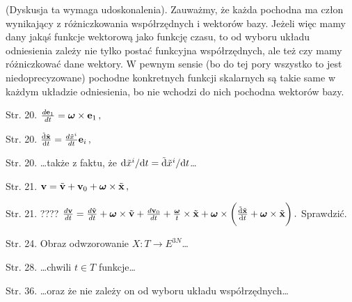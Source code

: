 \documentclass[a4paper,11pt]{article}
\numberwithin{equation}{section}
\begin{document}
(Dyskusja ta wymaga udoskonalenia). Zauważmy, że każda pochodna ma
człon wynikający z różniczkowania współrzędnych i wektorów bazy.
Jeżeli więc mamy dany jakąś funkcje wektorową jako funkcję czasu, to
od wyboru układu odniesienia zależy nie tylko postać funkcyjna
współrzędnych, ale też czy mamy różniczkować dane wektory. W pewnym
sensie (bo do tej pory wszystko to jest niedoprecyzowane) pochodne
konkretnych funkcji skalarnych są takie same w każdym układzie
odniesienia, bo nie wchodzi do nich pochodna wektorów bazy.



Str. 20.
$\frac{ d\mathbf{e}_{ 1 } }{ dt } = \boldsymbol{\omega} \times \mathbf{e}_{ 1 } \, ,$

Str. 20.
$\frac{ \tilde{ \mathrm{d} } \tilde{ \mathbf{x} } }{ \mathrm{d} t }
= \frac{ d\tilde{ x }^{ i } }{ dt } \mathbf{e}_{ i } \, ,$

Str. 20. \ldots także z faktu, że
$\mathrm{d} \tilde{ x }^{ i } / \mathrm{d} t = \tilde{ \mathrm{d} } \tilde{ x
}^{ i } / \mathrm{d} t$\ldots

Str. 21.
$\mathbf{v} = \tilde{ \mathbf{v} } + \mathbf{v}_{ 0 } +
\boldsymbol{\omega} \times \tilde{ \mathbf{x} } \, ,$

Str. 21. ????
$\frac{ d\mathbf{v} }{ dt } = \frac{ d\tilde{ \mathbf{v} } }{ dt }
+ \boldsymbol{\omega} \times \tilde{ \mathbf{v} } + \frac{
  d\mathbf{v}_{ 0 } }{ dt } + \frac{ \boldsymbol{\omega} }{ t }
\times \tilde{ \mathbf{x} } + \boldsymbol{\omega}  \times \bigg(
\frac{ \tilde{ \mathrm{d} } \tilde{ \mathbf{x} } }{ \mathrm{d} t } +
\boldsymbol{\omega} \times \tilde{ \mathbf{x} } \bigg) \, .$
Sprawdzić.

Str. 24. Obraz odwzorowanie
$X : T \rightarrow E^{ 3N }$\ldots

Str. 28. \ldots chwili $t \in T$ funkcje\ldots

Str. 36. \ldots oraz że nie zależy on od wyboru układu
współrzędnych\ldots


\vspace{\spaceTwo}










\newpage


\end{document}
